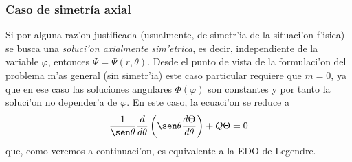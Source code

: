\subsubsection{Caso de simetr\'ia axial}
Si por alguna raz'on justificada (usualmente, de simetr'ia de la situaci'on f'isica) se busca una \textit{soluci'on axialmente sim'etrica}, es decir, independiente de la variable $\varphi$, entonces $\Psi=\Psi(r,\theta)$. Desde el punto de vista de la formulaci'on del problema m'as general (sin simetr'ia) este caso particular requiere que $m=0$, ya que en ese caso las soluciones angulares $\Phi(\varphi)$ son constantes y por tanto la soluci'on no depender'a de $\varphi$. En este caso, la ecuaci'on se reduce a
\begin{equation}
\frac{1}{\sen\theta}\frac{d}{d\theta}\left(\sen\theta\frac{d\Theta}{d\theta}\right)
+Q\Theta = 0
\end{equation}
que, como veremos a continuaci'on, es equivalente a la EDO de Legendre.
